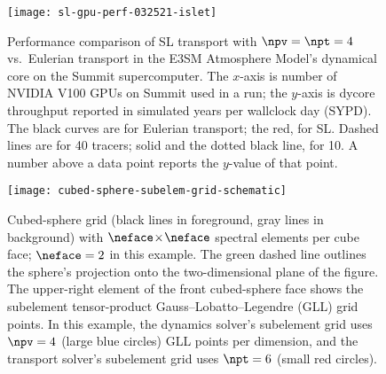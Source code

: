 \begin{figure}[tbh]
  \centering
  \texttt{[image: sl-gpu-perf-032521-islet]}
  \caption{
    Performance comparison of SL transport with $\npv=\npt=4$ vs.~Eulerian transport
    in the E3SM Atmosphere Model's dynamical core on the Summit supercomputer.
    The $x$-axis is number of NVIDIA V100 GPUs on Summit used in a run;
    the $y$-axis is dycore throughput reported in simulated years per wallclock day (SYPD).
    The black curves are for Eulerian transport; the red, for SL.
    Dashed lines are for 40 tracers; solid and the dotted black line, for 10.
    A number above a data point reports the $y$-value of that point.
  }
  \label{fig:summit-perf}
\end{figure}

\begin{figure}[tb]
  \centering
  \texttt{[image: cubed-sphere-subelem-grid-schematic]}
  \caption{
    Cubed-sphere grid (black lines in foreground, gray lines in background)
    with $\neface\!\times\!\neface$ spectral elements per cube face;
    $\neface=2$ in this example.
    The green dashed line outlines the sphere's projection onto the two-dimensional plane of the figure.
    The upper-right element of the front cubed-sphere face shows the subelement tensor-product Gauss--Lobatto--Legendre (GLL) grid points.
    In this example, the dynamics solver's subelement grid uses $\npv=4$ (large blue circles) GLL points per dimension,
    and the transport solver's subelement grid uses $\npt=6$ (small red circles).
  }
  \label{fig:cubed-sphere-subelem-grid-schematic}
\end{figure}

